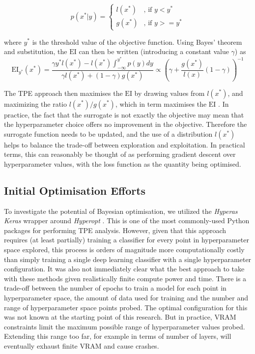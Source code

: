 \begin{equation}
    p(x^*|y) = \begin{cases} \textit{l}(x^*) & \mbox{, if }  y <y^* \\ \textit{g}(x^*) & \mbox{, if } y>=y^* \end{cases}
\end{equation}

where $y^*$ is the threshold value of the objective function. Using Bayes' theorem and substitution, the $\textrm{EI}$ can then be written (introducing a constant value $\gamma$) as 
\begin{equation}
    \textrm{EI}_{y^*}(x^*)=\frac{\gamma y^* \textit{l}(x^*)-\textit{l}(x^*)\int_{-\infty}^{y^*}p(y)dy}{\gamma \textit{l}(x^*)+(1-\gamma) \textit{g}(x^*)} \propto \left( \gamma +\frac{\textit{g}(x^*)}{\textit{l}(x)} (1-\gamma)\right)^{-1}
\end{equation}


The TPE approach then maximises the $\textrm{EI}$ by drawing values from $\textit{l}(x^*)$, and maximizing the ratio $\textit{l}(x^*)/\textit{g}(x^*)$, which in term maximises the $\textrm{EI}$ \cite{tdshyper}. In practice, the fact that the surrogate is not exactly the objective may mean that the hyperparameter choice offers no improvement in the objective. Therefore the surrogate function needs to be updated, and the use of a distribution $\textit{l}(x^*)$ helps to balance the trade-off between exploration and exploitation. In practical terms, this can reasonably be thought of as performing gradient descent over hyperparameter values, with the loss function as the quantity being optimised.

\subsection{Initial Optimisation Efforts}

To investigate the potential of Bayesian optimisation, we utilized the \textit{Hyperas} \cite{hyperas} \textit{Keras} wrapper around \textit{Hyperopt} \cite{hyperopt}. This is one of the most commonly-used Python packages for performing TPE analysis. However, given that this approach requires (at least partially) training a classifier for every point in hyperparameter space explored, this process is orders of magnitude more computationally costly than simply training a single deep learning classifier with a single hyperparameter configuration. It was also not immediately clear what the best approach to take with these methods given realistically finite compute power and time. There is a trade-off between the number of epochs to train a model for each point in hyperparameter space, the amount of data used for training and the number and range of hyperparameter space points probed. The optimal configuration for this was not known at the starting point of this research. But in practice, VRAM constraints limit the maximum possible range of hyperparameter values probed. Extending this range too far, for example in terms of number of layers, will eventually exhaust finite VRAM and cause crashes.

